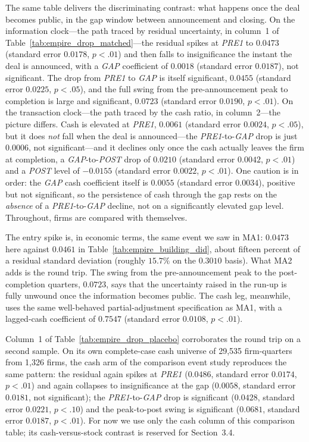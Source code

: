 The same table delivers the discriminating contrast: what happens once the deal becomes public, in the gap window between announcement and closing. On the information clock---the path traced by residual uncertainty, in column~1 of Table~\ref{tab:empire_drop_matched}---the residual spikes at \textit{PRE1} to $0.0473$ (standard error $0.0178$, $p<.01$) and then falls to insignificance the instant the deal is announced, with a \textit{GAP} coefficient of $0.0018$ (standard error $0.0187$), not significant. The drop from \textit{PRE1} to \textit{GAP} is itself significant, $0.0455$ (standard error $0.0225$, $p<.05$), and the full swing from the pre-announcement peak to completion is large and significant, $0.0723$ (standard error $0.0190$, $p<.01$). On the transaction clock---the path traced by the cash ratio, in column~2---the picture differs. Cash is elevated at \textit{PRE1}, $0.0061$ (standard error $0.0024$, $p<.05$), but it does \emph{not} fall when the deal is announced---the \textit{PRE1}-to-\textit{GAP} drop is just $0.0006$, not significant---and it declines only once the cash actually leaves the firm at completion, a \textit{GAP}-to-\textit{POST} drop of $0.0210$ (standard error $0.0042$, $p<.01$) and a \textit{POST} level of $-0.0155$ (standard error $0.0022$, $p<.01$). One caution is in order: the \textit{GAP} cash coefficient itself is $0.0055$ (standard error $0.0034$), positive but not significant, so the persistence of cash through the gap rests on the \emph{absence} of a \textit{PRE1}-to-\textit{GAP} decline, not on a significantly elevated gap level. Throughout, firms are compared with themselves.

The entry spike is, in economic terms, the same event we saw in MA1: $0.0473$ here against $0.0461$ in Table~\ref{tab:empire_building_did}, about fifteen percent of a residual standard deviation (roughly $15.7\%$ on the $0.3010$ basis). What MA2 adds is the round trip. The swing from the pre-announcement peak to the post-completion quarters, $0.0723$, says that the uncertainty raised in the run-up is fully unwound once the information becomes public. The cash leg, meanwhile, uses the same well-behaved partial-adjustment specification as MA1, with a lagged-cash coefficient of $0.7547$ (standard error $0.0108$, $p<.01$).

Column~1 of Table~\ref{tab:empire_drop_placebo} corroborates the round trip on a second sample. On its own complete-case cash universe of 29,535 firm-quarters from 1,326 firms, the cash arm of the comparison event study reproduces the same pattern: the residual again spikes at \textit{PRE1} ($0.0486$, standard error $0.0174$, $p<.01$) and again collapses to insignificance at the gap ($0.0058$, standard error $0.0181$, not significant); the \textit{PRE1}-to-\textit{GAP} drop is significant ($0.0428$, standard error $0.0221$, $p<.10$) and the peak-to-post swing is significant ($0.0681$, standard error $0.0187$, $p<.01$). For now we use only the cash column of this comparison table; its cash-versus-stock contrast is reserved for Section~3.4.

